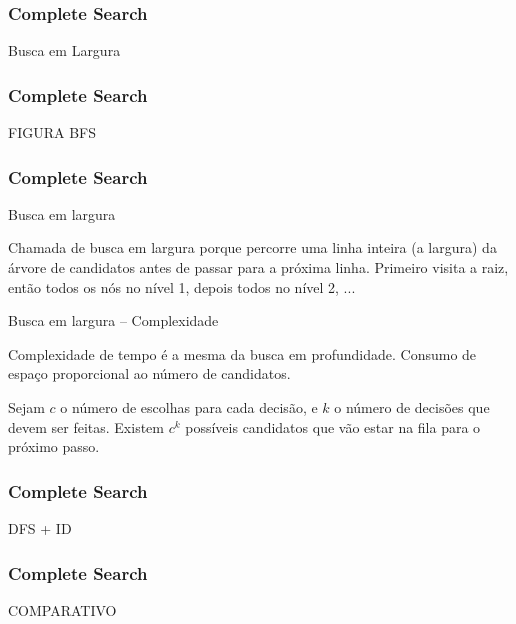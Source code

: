 \begin{frame}
\frametitle{Complete Search}
\begin{block}{Busca em Largura}
\end{block}
\end{frame}

\begin{frame}
\frametitle{Complete Search}
\huge FIGURA BFS
\end{frame}

\begin{frame}
\frametitle{Complete Search}
\begin{block}{Busca em largura}
\begin{itemize}
	\bitem Chamada de busca em largura porque percorre uma linha inteira (a largura) da árvore de candidatos antes de passar para a próxima linha.
	\bitem Primeiro visita a raiz, então todos os nós no nível 1, depois todos no nível 2, ...
\end{itemize}
\end{block}

\begin{block}{Busca em largura -- Complexidade}
\begin{itemize}
	\bitem Complexidade de tempo é a mesma da busca em profundidade.
	\bitem Consumo de espaço proporcional ao número de candidatos.
	\begin{itemize}
		\bitem Sejam $c$ o número de escolhas para cada decisão, e $k$ o número de decisões que devem ser feitas.
		\bitem Existem $c^k$ possíveis candidatos que vão estar na fila para o próximo passo.
	\end{itemize}
\end{itemize}
\end{block}
\end{frame}

\begin{frame}
\frametitle{Complete Search}
\huge DFS + ID
\end{frame}

\begin{frame}
\frametitle{Complete Search}
\huge COMPARATIVO
\end{frame}

